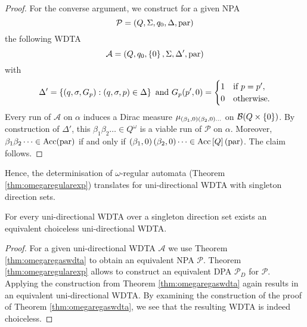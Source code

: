 \begin{proof}
  For the converse argument, we construct for a given \ac{NPA}
  \begin{equation*}
    \mathcal{P} = \left(Q, \Sigma, q_{0}, \Delta, \operatorname{par}\right)
  \end{equation*}
  the following \ac{WDTA}
  \begin{equation*}
    \mathcal{A} = \left(Q, q_{0}, \left\{0\right\}, \Sigma, \Delta', \operatorname{par}\right)
  \end{equation*}
  with 
  \begin{equation*}
    \Delta' = \left\{\left(q, \sigma, G_{p}\right):\left(q, \sigma, p\right)\in\Delta\right\}
    \text{ and }
    G_{p}(p', 0) = \begin{cases}
      1&\text{if }p = p',\\
      0&\text{otherwise}.
    \end{cases}
  \end{equation*}
  Every run of $\mathcal{A}$ on $\alpha$ induces a Dirac measure
  $\mu_{\left(\beta_{1}, 0\right)\left(\beta_{2}, 0\right)\dots}$ on
  $\mathcal{B}(Q\times\left\{0\right\})$. By construction of $\Delta'$, this
  $\beta_{1}\beta_{2}\dots\in Q^{\omega}$ is a viable run of $\mathcal{P}$ on
  $\alpha$. Moreover, $\beta_{1}\beta_{2}\dots\in\operatorname{Acc}(\operatorname{par})$ if and only if
  $\left(\beta_{1}, 0\right)\left(\beta_{2}, 0\right)\dots\in\operatorname{Acc}\left[Q\right](\operatorname{par})$.
  The claim follows.
\end{proof}

Hence, the determinisation of $\omega$-regular automata (Theorem
\ref{thm:omegaregularexp}) translates for uni-directional \ac{WDTA} with
singleton direction sets.
\begin{corollary}
  For every uni-directional \ac{WDTA} over a singleton direction set exists
  an equivalent choiceless uni-directional \ac{WDTA}.
\end{corollary}
\begin{proof}
  For a given uni-directional \ac{WDTA} $\mathcal{A}$ we use Theorem
  \ref{thm:omegaregaswdta} to obtain an equivalent \ac{NPA} $\mathcal{P}$.
  Theorem \ref{thm:omegaregularexp} allows to construct an equivalent \ac{DPA}
  $\mathcal{P}_{D}$ for $\mathcal{P}$. Applying the construction from Theorem
  \ref{thm:omegaregaswdta} again results in an equivalent uni-directional
  \ac{WDTA}. By examining the construction of the proof of Theorem
  \ref{thm:omegaregaswdta}, we see that the resulting \ac{WDTA} is indeed
  choiceless.
\end{proof}

